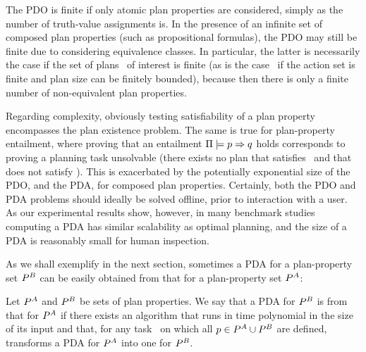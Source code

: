 %
%
The PDO is finite if only atomic plan properties are considered,
simply as the number of truth-value assignments is. In the presence of
an infinite set of composed plan properties (such as propositional
formulas), the PDO may still be finite due to considering equivalence
classes. In particular, the latter is necessarily the case if the set
of plans \plans\ of interest is finite (as is the case \eg\ if the
action set is finite and plan size can be finitely bounded), because
then there is only a finite number of non-equivalent plan properties.

Regarding complexity, obviously testing satisfiability of a plan
property encompasses the plan existence problem. The same is true for
plan-property entailment, where proving that an entailment
$\Pi \models p \Rightarrow q$ holds corresponds to proving a
planning task unsolvable (there exists no plan that satisfies
\prop\ and that does not satisfy \propq). This is exacerbated by the
potentially exponential size of the PDO, and the PDA, for composed
plan properties. Certainly, both the PDO and PDA problems should
ideally be solved offline, prior to interaction with a user. As our
experimental results show, however, in many benchmark studies
computing a PDA has similar scalability as optimal planning, and the
size of a PDA is reasonably small for human inspection.





As we shall exemplify in the next section, sometimes a PDA for a
plan-property set $P^B$ can be easily obtained from that for a
plan-property set $P^A$:

\begin{definition}
Let $P^A$ and $P^B$ be sets of plan properties. We say that
a PDA for $P^B$ is  from that for
$P^A$ if there exists an algorithm that runs in time polynomial
in the size of its input and that, for any task \task\ on which all
$p \in P^A \cup P^B$ are defined, transforms a PDA for
$P^A$ into one for $P^B$.
\end{definition}





